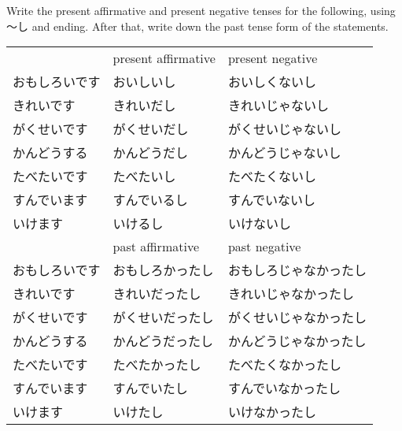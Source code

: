 \documentclass[notoc,notitlepage]{tufte-book}
\begin{document}
\begin{ex}
  Write the present affirmative and present negative tenses for the following, using 〜し and ending. After that, write down the past tense form of the statements.

  \begin{tabular}{l l l}
                   & present affirmative & present negative \\
    おもしろいです & おいしいし          & おいしくないし \\
    きれいです     & きれいだし          & きれいじゃないし \\
    がくせいです   & がくせいだし        & がくせいじゃないし \\
    かんどうする   & かんどうだし        & かんどうじゃないし \\
    たべたいです   & たべたいし          & たべたくないし \\
    すんでいます   & すんでいるし        & すんでいないし \\
    いけます       & いけるし            & いけないし \\
                   & past affirmative    & past negative \\
    おもしろいです & おもしろかったし    & おもしろじゃなかったし \\
    きれいです     & きれいだったし      & きれいじゃなかったし \\
    がくせいです   & がくせいだったし    & がくせいじゃなかったし \\
    かんどうする   & かんどうだったし    & かんどうじゃなかったし \\
    たべたいです   & たべたかったし      & たべたくなかったし \\
    すんでいます   & すんでいたし        & すんでいなかったし \\
    いけます       & いけたし            & いけなかったし
  \end{tabular}
\end{ex}
\end{document}
